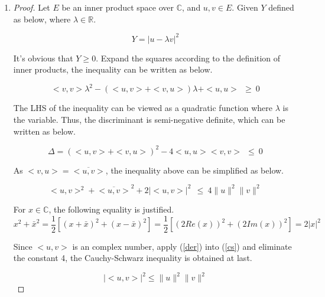 \documentclass[paper=a4, fontsize=11pt]{scrartcl} %
\numberwithin{equation}{section} %
\numberwithin{figure}{section} %
\numberwithin{table}{section} %
\begin{document}
\begin{enumerate}
	\item
		\begin{proof}
			Let $E$ be an inner product space over $\mathbb{C}$, and $u, v\in E$.
			Given $Y$ defined as below, where $\lambda \in \mathbb{R}$.
						
			\begin{equation}
				Y = {\vert u-\lambda v \vert}^2
			\end{equation}
			
			It's obvious that $Y\geq0$. Expand the squares according to the definition of inner products, the inequality can be written as below.
			
			\begin{equation}
				<v, v>\lambda^2 -(<u, v>+<v, u>)\lambda + <u, u> \ \ \geq \ 0
			\end{equation}
			
			The LHS of the inequality can be viewed as a quadratic function where $\lambda$ is the variable. Thus, the discriminant is semi-negative definite, which can be written as below.
			
			\begin{equation}
				\Delta = (<u, v>+<v, u>)^2 - 4<u,u><v,v> \ \ \leq \ 0
			\end{equation}
			
			As $<v, u> = \overline{<u, v>}$, the inequality above can be simplified as below.
			
			\begin{equation}
				<u, v>^2 + {\overline{<u, v>}}^2 + 2{\vert <u,v> \vert}^2 \ \ \leq \ 4 \lVert u \rVert^2 \lVert v \rVert^2 \label{cs}			
			\end{equation}
			
			For $x \in \mathbb{C}$, the following equality is justified.
			\begin{equation}
				x^2 + \bar{x}^2 = \frac{1}{2}[(x+\bar{x})^2+(x-\bar{x})^2] = \frac{1}{2}[(2Re(x))^2+(2Im(x))^2] = 2 {\vert x \vert}^2 \label{der}
			\end{equation}
			
			Since $<u, v>$ is an complex number, apply (\ref{der}) into (\ref{cs}) and eliminate the constant 4, the Cauchy-Schwarz inequality is obtained at last.
			
			\begin{equation}
				{\vert <u,v> \vert}^2 \leq \lVert u \rVert^2 \lVert v \rVert^2
			\end{equation}
  
		\end{proof}


\end{enumerate}
\end{document}
